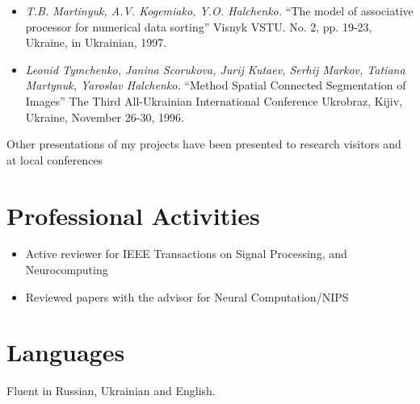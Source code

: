 \documentclass[10pt,overlapped,line]{res}
\newcommand{\mtitle}[1]{``#1''}
\newcommand{\mauthors}[1]{ \textit{#1.}}
\newcommand{\mwhere}[1]{#1.}
\begin{document}
\begin{resume}
\begin{itemize}
   \item
     \mauthors{T.B. Martinyuk, A.V. Kogemiako, Y.O. Halchenko}
     \mtitle{The model of associative processor for numerical data sorting}
     \mwhere{ Visnyk VSTU. No. 2, pp. 19-23, Ukraine, in Ukrainian, 1997}

   \item
     \mauthors{Leonid Tymchenko, Janina Scorukova, Jurij Kutaev, Serhij Markov, Tatiana Martynuk, Yaroslav Halchenko}
     \mtitle{Method Spatial Connected Segmentation of Images}
     \mwhere{The Third All-Ukrainian International Conference Ukrobraz, Kijiv, Ukraine, November 26-30, 1996}
 \end{itemize}

 Other presentations of my projects have been presented to research visitors and at local conferences

\section{Professional Activities}
\begin{itemize}
\item Active reviewer for IEEE Transactions on Signal Processing, and Neurocomputing
\item Reviewed papers with the advisor for Neural Computation/NIPS
\end{itemize}


 \section{Languages}
 Fluent in Russian, Ukrainian and English.


\end{resume}
\end{document}
